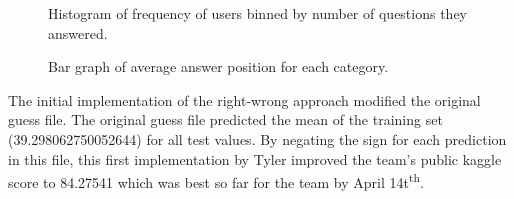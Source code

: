 \documentclass[letterpaper]{article}
\begin{document}
\begin{figure}[H]
	\begin{center}
	\end{center}
	\caption{Histogram of frequency of users binned by number of questions they answered.}
	\label{fig:userHisto}
\end{figure}

\begin{figure}[H]
	\begin{center}
	\end{center}
	\caption{Bar graph of average answer position for each category.}
	\label{fig:categoryAverages}
\end{figure}

The initial implementation of the right-wrong approach modified the original guess file. The original guess file predicted the mean of the training set (39.298062750052644) for all test values. By negating the sign for each prediction in this file, this first implementation by Tyler improved the team's public kaggle score to 84.27541 which was best so far for the team by April 14t\textsuperscript{th}.
\end{document}
